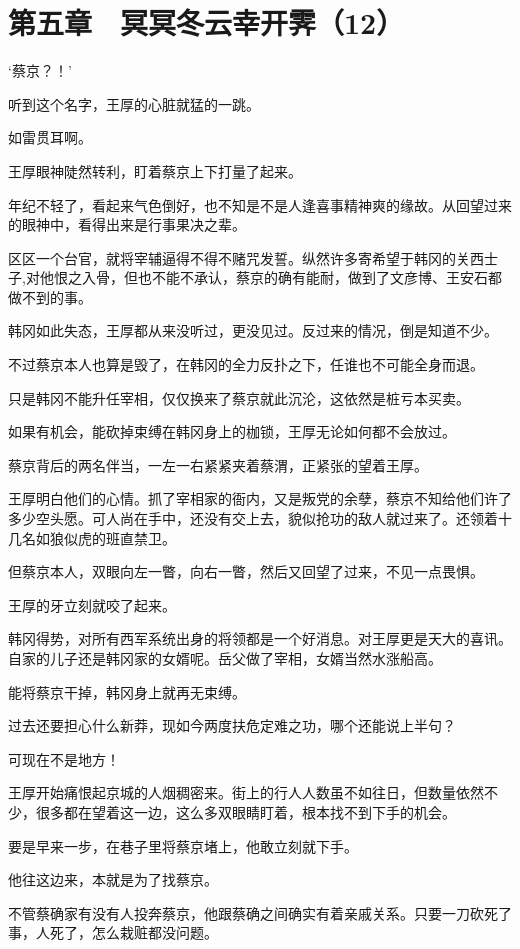 \section{第五章　冥冥冬云幸开霁（12）}

‘蔡京？！’

听到这个名字，王厚的心脏就猛的一跳。

如雷贯耳啊。

王厚眼神陡然转利，盯着蔡京上下打量了起来。

年纪不轻了，看起来气色倒好，也不知是不是人逢喜事精神爽的缘故。从回望过来的眼神中，看得出来是行事果决之辈。

区区一个台官，就将宰辅逼得不得不赌咒发誓。纵然许多寄希望于韩冈的关西士子,对他恨之入骨，但也不能不承认，蔡京的确有能耐，做到了文彦博、王安石都做不到的事。

韩冈如此失态，王厚都从来没听过，更没见过。反过来的情况，倒是知道不少。

不过蔡京本人也算是毁了，在韩冈的全力反扑之下，任谁也不可能全身而退。

只是韩冈不能升任宰相，仅仅换来了蔡京就此沉沦，这依然是桩亏本买卖。

如果有机会，能砍掉束缚在韩冈身上的枷锁，王厚无论如何都不会放过。

蔡京背后的两名伴当，一左一右紧紧夹着蔡渭，正紧张的望着王厚。

王厚明白他们的心情。抓了宰相家的衙内，又是叛党的余孽，蔡京不知给他们许了多少空头愿。可人尚在手中，还没有交上去，貌似抢功的敌人就过来了。还领着十几名如狼似虎的班直禁卫。

但蔡京本人，双眼向左一瞥，向右一瞥，然后又回望了过来，不见一点畏惧。

王厚的牙立刻就咬了起来。

韩冈得势，对所有西军系统出身的将领都是一个好消息。对王厚更是天大的喜讯。自家的儿子还是韩冈家的女婿呢。岳父做了宰相，女婿当然水涨船高。

能将蔡京干掉，韩冈身上就再无束缚。

过去还要担心什么新莽，现如今两度扶危定难之功，哪个还能说上半句？

可现在不是地方！

王厚开始痛恨起京城的人烟稠密来。街上的行人人数虽不如往日，但数量依然不少，很多都在望着这一边，这么多双眼睛盯着，根本找不到下手的机会。

要是早来一步，在巷子里将蔡京堵上，他敢立刻就下手。

他往这边来，本就是为了找蔡京。

不管蔡确家有没有人投奔蔡京，他跟蔡确之间确实有着亲戚关系。只要一刀砍死了事，人死了，怎么栽赃都没问题。

